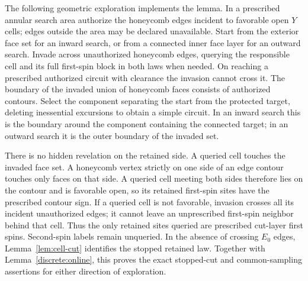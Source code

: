 \documentclass[11pt]{article}
\theoremstyle{definition}
\theoremstyle{remark}
\numberwithin{equation}{section}
\begin{document}
The following geometric exploration implements the lemma. In a prescribed
annular search area authorize the honeycomb edges incident to favorable
open $Y$ cells; edges outside the area may be declared unavailable. Start
from the exterior face set for an inward search, or from a connected inner
face layer for an outward search. Invade across unauthorized honeycomb
edges, querying the responsible cell and its full first-spin block in both
laws when needed. On reaching a prescribed authorized circuit with
clearance the invasion cannot cross it. The boundary of the invaded union
of honeycomb faces consists of authorized contours. Select the component
separating the start from the protected target, deleting inessential
excursions to obtain a simple circuit. In an inward search this is the
boundary around the component containing the connected target; in an
outward search it is the outer boundary of the invaded set.

There is no hidden revelation on the retained side. A queried cell touches
the invaded face set. A honeycomb vertex strictly on one side of an edge
contour touches only faces on that side. A queried cell meeting both sides
therefore lies on the contour and is favorable open, so its retained
first-spin sites have the prescribed contour sign. If a queried cell is
not favorable, invasion crosses all its incident unauthorized edges; it
cannot leave an unprescribed first-spin neighbor behind that cell. Thus
the only retained sites queried are prescribed cut-layer first spins.
Second-spin labels remain unqueried. In the absence of crossing $E_0$
edges, Lemma~\ref{lem:cell-cut} identifies the stopped retained law.
Together with Lemma~\ref{discrete:online}, this proves the exact stopped-cut
and common-sampling assertions for either direction of exploration.
\end{document}
